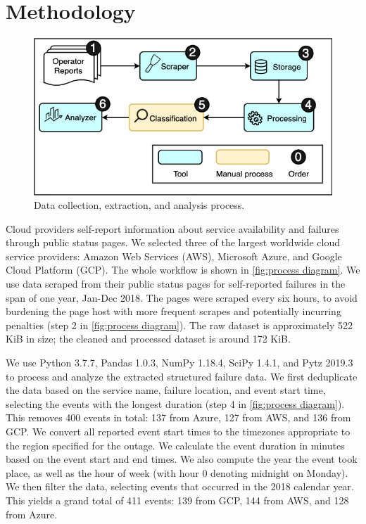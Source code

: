\section{Methodology}
\begin{figure}[h]
  \centering
  \includegraphics[scale=0.5]{diagrams/process.png}
  \caption{Data collection, extraction, and analysis process.}
  \label{fig:process diagram}
\end{figure}
Cloud providers self-report information about service availability and failures through public status pages.
We selected three of the largest worldwide cloud service providers: Amazon Web Services (AWS), Microsoft Azure, and Google Cloud Platform (GCP).
The whole workflow is shown in \autoref{fig:process diagram}.
We use data scraped from their public status pages for self-reported failures \cite{awsFeed, gcpFeed, azureFeed} in the span of one year, Jan-Dec 2018.
The pages were scraped every six hours, to avoid burdening the page host with more frequent scrapes and potentially incurring penalties (step 2 in \autoref{fig:process diagram}).
The raw dataset is approximately 522 KiB in size; the cleaned and processed dataset is around 172 KiB.

We use Python 3.7.7, Pandas 1.0.3, NumPy 1.18.4, SciPy 1.4.1, and Pytz 2019.3 to process and analyze the extracted structured failure data.
We first deduplicate the data based on the service name, failure location, and event start time, selecting the events with the longest duration (step 4 in \autoref{fig:process diagram}).
This removes 400 events in total: 137 from Azure, 127 from AWS, and 136 from GCP.
We convert all reported event start times to the timezones appropriate to the region specified for the outage.
We calculate the event duration in minutes based on the event start and end times.
We also compute the year the event took place, as well as the hour of week (with hour 0 denoting midnight on Monday).
We then filter the data, selecting events that occurred in the 2018 calendar year.
This yields a grand total of 411 events: 139 from GCP, 144 from AWS, and 128 from Azure.

